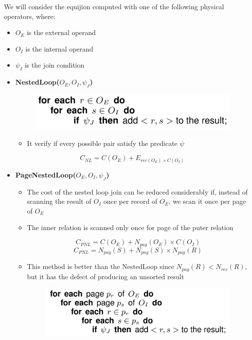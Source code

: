 We will consider the equijion computed with one of the following physical operators, where:
\begin{itemize}
    \item $O_E$ is the external operand
    \item $O_I$ is the internal operand
    \item $\psi_I$ is the join condition
\end{itemize}
\begin{itemize}
    \item \textbf{NestedLoop($O_E, O_I, \psi_J$)}
    \begin{figure}[h]
        \centering
        \includegraphics[width=.5\linewidth]{images/DBMS_Internals/ImplementationOfRelationalOperator/NestedLoop.jpeg}
        \end{figure}
    \begin{itemize}
        \item It verify if every possible pair satisfy the predicate $\psi$
    \end{itemize}
    $$C_{NL} = C(O_E) + E_{rec(O_E) \times C(O_I)}$$
    \item \textbf{PageNestedLoop($O_E, O_I, \psi_J$)}
    \begin{itemize}
        \item The cost of the nested loop join can be reduced considerably if, instead of scanning the result of $O_I$ once per record of $O_E$, we scan it once per page of $O_E$
        \item The inner relation is scanned only once for page of the puter relation
        
        $$C_{PNL} = C(O_E) + N_{pag}(O_E) \times C(O_I)$$
        $$C_{PNL} = N_{pag}(S) + N_{pag}(S) \times N_{pag}(R)$$
        \item This method is better than the NestedLoop since $N_{pag}(R) < N_{rec}(R)$, but it has the defect of producing an unsorted result

        \begin{figure}[h]
        \centering
        \includegraphics[width=.5\linewidth]{images/DBMS_Internals/ImplementationOfRelationalOperator/PageNestedLoop.jpeg}
        \end{figure}
    \end{itemize}
    

\end{itemize}

